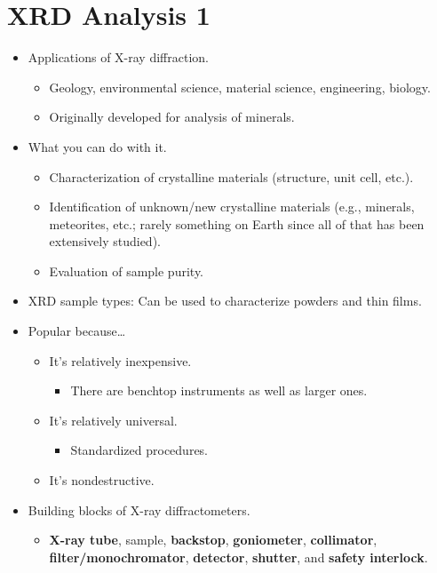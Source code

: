 \documentclass[../notes.tex]{subfiles}
\begin{document}
\section{XRD Analysis 1}
\begin{itemize}
    \item {}Applications of X-ray diffraction.
    \begin{itemize}
        \item Geology, environmental science, material science, engineering, biology.
        \item Originally developed for analysis of minerals.
    \end{itemize}
    \item What you can do with it.
    \begin{itemize}
        \item Characterization of crystalline materials (structure, unit cell, etc.).
        \item Identification of unknown/new crystalline materials (e.g., minerals, meteorites, etc.; rarely something on Earth since all of that has been extensively studied).
        \item Evaluation of sample purity.
    \end{itemize}
    \item XRD sample types: Can be used to characterize powders and thin films.
    \item Popular because\dots
    \begin{itemize}
        \item It's relatively inexpensive.
        \begin{itemize}
            \item There are benchtop instruments as well as larger ones.
        \end{itemize}
        \item It's relatively universal.
        \begin{itemize}
            \item Standardized procedures.
        \end{itemize}
        \item It's nondestructive.
    \end{itemize}
    \item Building blocks of X-ray diffractometers.
    \begin{itemize}
        \item \textbf{X-ray tube}, sample, \textbf{backstop}, \textbf{goniometer}, \textbf{collimator}, \textbf{filter/monochromator}, \textbf{detector}, \textbf{shutter}, and \textbf{safety interlock}.

\end{itemize}
\end{itemize}
\end{document}
